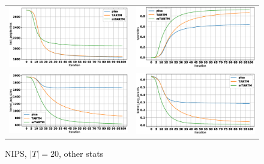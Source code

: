 \documentclass[12pt]{article}
\begin{document}
\begin{figure}[htb]
\centering
  \begin{tabular}{@{}cc@{}}
    \includegraphics[width=.5\linewidth]{pictures/NIPS_20t_test_perplexities.eps} &
    \includegraphics[width=.5\linewidth]{pictures/NIPS_20t_sparsities.eps} \\
    \includegraphics[width=.5\linewidth]{pictures/NIPS_20t_kernel_avg_sizes.eps} &
    \includegraphics[width=.5\linewidth]{pictures/NIPS_20t_kernel_avg_jacards.eps} \\
  \end{tabular}
  \caption{NIPS, $|T| = 20$, other stats}
\end{figure}
\end{document}
